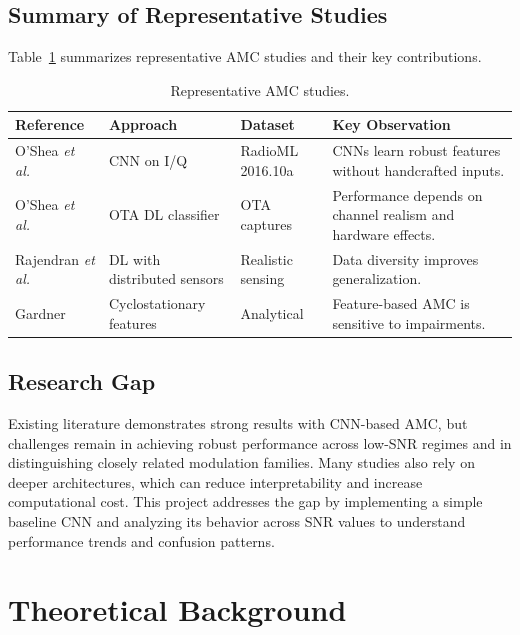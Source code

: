\documentclass[12pt,a4paper]{report}
\begin{document}
\section{Summary of Representative Studies}
Table~\ref{tab:related-work} summarizes representative AMC studies and their key contributions.

\begin{table}[H]
    \centering
    \caption{Representative AMC studies.}
    \label{tab:related-work}
    \begin{tabular}{p{} p{} p{} p{}}
        \toprule
        \textbf{Reference} & \textbf{Approach} & \textbf{Dataset} & \textbf{Key Observation} \\
        \midrule
        O’Shea \textit{et al.}~\cite{oshea2016cnn} & CNN on I/Q & RadioML 2016.10a & CNNs learn robust features without handcrafted inputs. \\
        O’Shea \textit{et al.}~\cite{oshea2018ota} & OTA DL classifier & OTA captures & Performance depends on channel realism and hardware effects. \\
        Rajendran \textit{et al.}~\cite{rajendran2018dl} & DL with distributed sensors & Realistic sensing & Data diversity improves generalization. \\
        Gardner~\cite{gardner1988} & Cyclostationary features & Analytical & Feature-based AMC is sensitive to impairments. \\
        \bottomrule
    \end{tabular}
\end{table}

\section{Research Gap}
Existing literature demonstrates strong results with CNN-based AMC, but challenges remain in achieving robust performance across low-SNR regimes and in distinguishing closely related modulation families. Many studies also rely on deeper architectures, which can reduce interpretability and increase computational cost. This project addresses the gap by implementing a simple baseline CNN and analyzing its behavior across SNR values to understand performance trends and confusion patterns.

\chapter{Theoretical Background}
\end{document}
